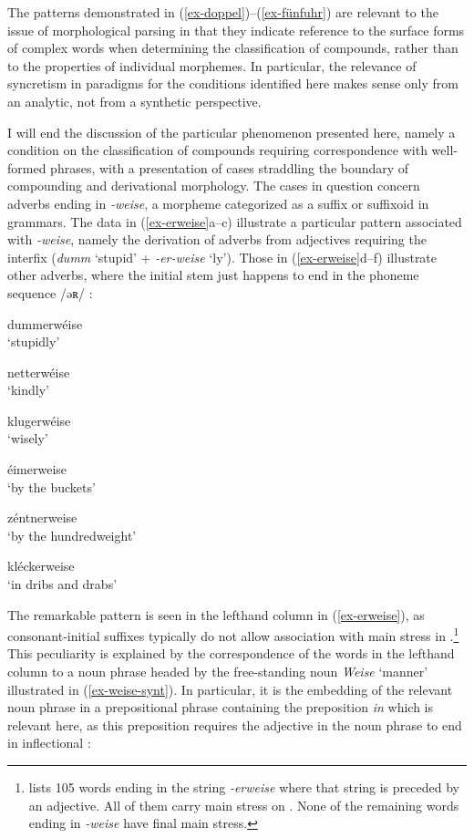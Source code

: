 \documentclass[output=paper
 ,nobabel
 ,draftmode
 ,colorlinks, citecolor=brown
]{langscibook}
\begin{document}
\enlargethispage{-5pt}
\noindent
The patterns demonstrated in (\ref{ex-doppel})--(\ref{ex-fünfuhr}) are relevant to the issue of morphological parsing in that they indicate reference to the surface forms of complex words when determining the classification of compounds, rather than to the properties of individual morphemes. In particular, the relevance of syncretism in paradigms for the conditions identified here makes sense only from an analytic, not from a synthetic perspective.

I will end the discussion of the particular phenomenon presented here, namely a condition on the
classification of compounds requiring correspondence with well-formed phrases, with a presentation
of cases straddling the boundary of compounding and derivational morphology.  The cases in question
concern adverbs ending in \emph{-weise}, a morpheme categorized as a suffix or suffixoid in 
grammars. The data in (\ref{ex-erweise}a--c) illustrate a particular pattern associated with
\emph{-weise}, namely the derivation of adverbs from adjectives requiring the interfix 
(\eg \emph{dumm} `stupid' + \emph{-er-weise} `ly'). Those in (\ref{ex-erweise}d--f) illustrate other
adverbs, where the initial stem just happens to end in the phoneme sequence /əʀ/ :


\begin{multicols}{2}
\eal\label{ex-erweise}
\ex\label{ex-dummerweise}
{dummerwéise}\\
`stupidly'

\ex\label{ex-netterweise}
{netterwéise}\\
`kindly'

\ex\label{ex-klugerweise}
{klugerwéise}\\
`wisely'


%
\columnbreak
%
\ex\label{ex-eimerweise}
{éimerweise}\\
`by the buckets'

\ex\label{ex-zentnerweise}
{zéntnerweise}\\
`by the hundredweight'

\ex\label{ex-kleckerweise}
{kléckerweise}\\
`in dribs and drabs'

\zl
\end{multicols}

\noindent
The remarkable pattern is seen in the lefthand column in (\ref{ex-erweise}), as consonant-initial
suffixes typically do not allow association with main stress in
.\footnote{\citet{Muthmann1989} lists 105 words ending in the string \emph{-erweise} where
  that string is preceded by an adjective. All of them carry main stress on . None of
  the remaining words ending in \emph{-weise} have final main stress.} This peculiarity is explained
by the correspondence of the words in the lefthand column to a noun phrase headed by the
free-standing noun \emph{Weise} `manner' illustrated in (\ref{ex-weise-synt}). In particular, it is
the embedding of the relevant noun phrase in a prepositional phrase containing the preposition
\emph{in} which is relevant here, as this preposition requires the adjective in the noun phrase to
end in inflectional :  
\end{document}
